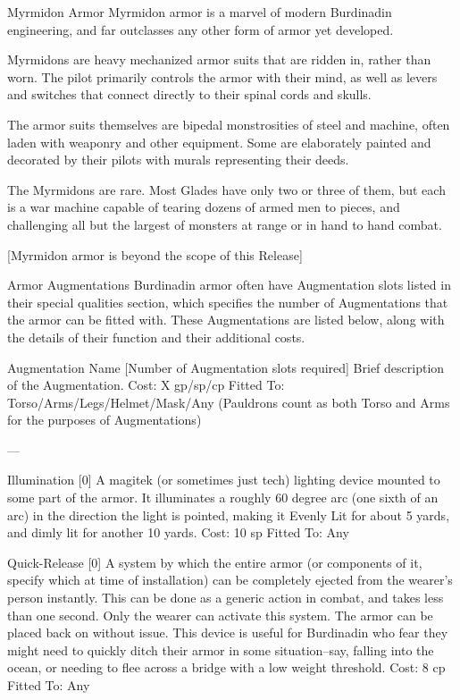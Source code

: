 \documentclass[oneside,11pt,english]{book}
\begin{document}
 

 

Myrmidon Armor 
Myrmidon armor is a marvel of modern Burdinadin engineering, and far outclasses any other form of 
armor yet developed. 

 

Myrmidons are heavy mechanized armor suits that are ridden in, rather than worn. The pilot primarily 
controls the armor with their mind, as well as levers and switches that connect directly to their spinal 
cords and skulls. 

 

The armor suits themselves are bipedal monstrosities of steel and machine, often laden with weaponry 
and other equipment. Some are elaborately painted and decorated by their pilots with murals representing 
their deeds. 

 

The Myrmidons are rare. Most Glades have only two or three of them, but each is a war machine capable 
of tearing dozens of armed men to pieces, and challenging all but the largest of monsters at range or in 
hand to hand combat. 

 


[Myrmidon armor is beyond the scope of this Release] 

 

Armor Augmentations 
Burdinadin armor often have Augmentation slots listed in their special qualities section, which specifies 
the number of Augmentations that the armor can be fitted with. These Augmentations are listed below, 
along with the details of their function and their additional costs. 

 

Augmentation Name [Number of Augmentation slots required] 
Brief description of the Augmentation. 
Cost: X gp/sp/cp 
Fitted To: Torso/Arms/Legs/Helmet/Mask/Any 
(Pauldrons count as both Torso and Arms for the purposes of Augmentations) 

 

--- 

 

Illumination [0] 
A magitek (or sometimes just tech) lighting device mounted to some part of the armor. It illuminates a 
roughly 60 degree arc (one sixth of an arc) in the direction the light is pointed, making it Evenly Lit for 
about 5 yards, and dimly lit for another 10 yards. 
Cost: 10 sp 
Fitted To: Any 

 

Quick-Release [0] 
A system by which the entire armor (or components of it, specify which at time of installation) can be 
completely ejected from the wearer’s person instantly. This can be done as a generic action in combat, 
and takes less than one second. Only the wearer can activate this system. The armor can be placed back 
on without issue. This device is useful for Burdinadin who fear they might need to quickly ditch their 
armor in some situation--say, falling into the ocean, or needing to flee across a bridge with a low weight 
threshold. 
Cost: 8 cp 
Fitted To: Any 
\end{document}
